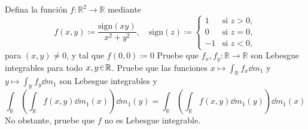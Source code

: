\setcounter{neje}{49}
\begin{nejer}
Defina la función
$
f \colon \mathbb{R}^2 \to \mathbb{R}
$
mediante
$$
f(x, y) \coloneq \frac{\text{sign}(xy)}{x^2 + y^2}, \quad \text{sign}(z) \coloneq \begin{cases} 
1 & \text{si } z > 0, \\
0 & \text{si } z = 0, \\
-1 & \text{si } z < 0,
\end{cases}
$$
para $(x, y) \neq 0$, y tal que
$
f(0, 0) \coloneq 0
$
Pruebe que $f_x, f_y \colon \mathbb{R} \to \mathbb{R}$ son Lebesgue integrables para todo $x, y \en \mathbb{R}$. Pruebe que las funciones $x \mapsto \int_{\mathbb{R}} f_x \dd{m_1}$ y $y \mapsto \int_{\mathbb{R}} f_y \dd{m_1}$ son Lebesgue integrables y
$$
\int_{\mathbb{R}} \left( \int_{\mathbb{R}} f(x, y) \dd{m_1(x)} \right) \dd{m_1(y)} = \int_{\mathbb{R}} \left( \int_{\mathbb{R}} f(x, y) \dd{m_1(y)} \right) \dd{m_1(x)}
$$
No obstante, pruebe que $f$ no es Lebesgue integrable.
\end{nejer}
